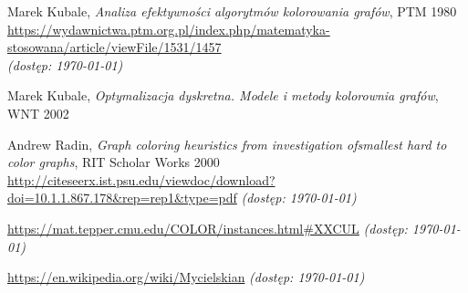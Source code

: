 \documentclass[10pt,a4paper]{article}
\begin{document}
	\vspace*{\fill}
	
	\begin{thebibliography}{0}
		Marek Kubale, \textit{Analiza efektywności algorytmów kolorowania grafów}, PTM 1980\\
		\url{https://wydawnictwa.ptm.org.pl/index.php/matematyka-stosowana/article/viewFile/1531/1457}\\
		\textit{(dostęp: \today)}
		
		Marek Kubale, \textit{Optymalizacja dyskretna. Modele i metody kolorownia grafów}, WNT 2002
		
		Andrew Radin, \textit{Graph coloring heuristics from investigation ofsmallest hard to color graphs}, RIT Scholar Works 2000
		\url{http://citeseerx.ist.psu.edu/viewdoc/download?doi=10.1.1.867.178\&rep=rep1\&type=pdf}
		\textit{(dostęp: \today)}
		
		\url{https://mat.tepper.cmu.edu/COLOR/instances.html#XXCUL}
		\textit{(dostęp: \today)}
		
		\url{https://en.wikipedia.org/wiki/Mycielskian}
		\textit{(dostęp: \today)}
		
		
	\end{thebibliography}
	
\end{document}
